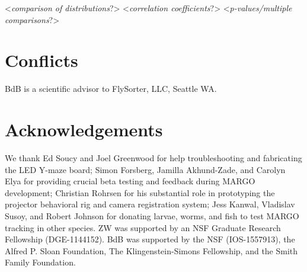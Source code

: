 \documentclass[10pt]{article}
\begin{document}
\begin{multicols}{2}
<\textit{comparison of distributions}?>
<\textit{correlation coefficients}?>
<\textit{p-values/multiple comparisons}?>

\section*{Conflicts}

BdB is a scientific advisor to FlySorter, LLC, Seattle WA.

\section*{Acknowledgements}

We thank Ed Soucy and Joel Greenwood for help troubleshooting and fabricating the LED Y-maze board; Simon Forsberg, Jamilla Akhund-Zade, and Carolyn Elya for providing crucial beta testing and feedback during MARGO development; Christian Rohrsen for his substantial role in prototyping the projector behavioral rig and camera registration system; Jess Kanwal, Vladislav Susoy, and Robert Johnson for donating larvae, worms, and fish to test MARGO tracking in other species. ZW was supported by an NSF Graduate Research Fellowship (DGE-1144152). BdB was supported by the NSF (IOS-1557913), the Alfred P. Sloan Foundation, The Klingenstein-Simons Fellowship, and the Smith Family Foundation. 

 
\end{multicols}
\end{document}
